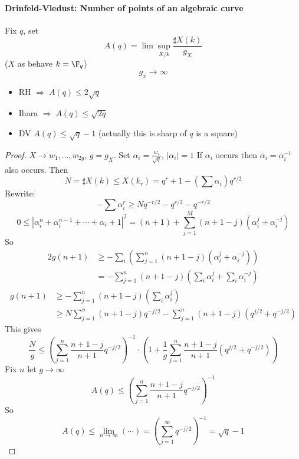 \paragraph{Drinfeld-Vledust: Number of points of an algebraic curve} Fix $q$, set
	$$A(q) = \lim\sup_{X/k} \frac{\sharp X(k)}{g_X}$$
	($X$ as behave $k=\F_q$)
	$$g_x\to \infty$$
	\begin{itemize}
	\item RH $\Rightarrow\; A(q)\leq 2\sqrt q$
	\item Ihara $\Rightarrow\; A(q)\leq \sqrt{2q}$
	\item DV $A(q)\leq \sqrt q-1$ (actually this is sharp of $q$ is a square)
	\end{itemize}
	
\begin{proof} $X\to w_1, \ldots, w_{2g}$, $g=g_{X}$. Set $\alpha_i=\frac{w_i}{\sqrt q}$, $|\alpha_i|=1$ If $\alpha_i$ occurs then $\overline\alpha_i=\alpha_i^{-1}$ also occurs. Then
	$$N=\sharp X(k)\leq X(k_r)=q^r+1-(\sum\alpha_i)q^{r/2}$$
Rewrite:
	$$-\sum\alpha_i^r\geq Nq^{-r/2}-q^{r/2}-q^{-r/2}$$
	$$0\leq |\alpha_i^n +\alpha_i^{n-1} +\cdots +\alpha_i +1|^2 =(n+1)+\sum_{j=1}^M(n+1-j)(\alpha_i^j+\alpha_i^{-j})$$
	So
	\begin{align*}
	2g(n+1) &\geq -\sum_i \left(\sum_{j=1}^n (n+1-j)(\alpha_i^j +\alpha_i^{-j})\right)\\
	&=-\sum_{j=1}^n (n+1-j)\left(\sum_i\alpha_i^j +\sum_i\alpha_i^{-j}\right)
	\end{align*}
	\begin{align*}
	g(n+1)&\geq -\sum_{j=1}^n (n+1-j)(\sum_i\alpha_i^j)\\
	&\geq N\sum_{j=1}^n (n+1-j)q^{-j/2}-\sum_{j=1}^n (n+1-j)(q^{j/2}+q^{-j/2})\end{align*}
	This gives
	$$\frac{N}{g}\leq \left(\sum_{j=1}^n \frac{n+1-j}{n+1}q^{-j/2} \right)^{-1}\cdot\left(1+\frac{1}{g}\sum_{j=1}^n\frac{n+1-j}{n+1}(q^{j/2}+q^{-j/2})\right)$$
	Fix $n$ let $g\to \infty$
	$$A(q)\leq \left(\sum_{j=1}^n \frac{n+1-j}{n+1}q^{-j/2}\right)^{-1}$$
	So 
	$$A(q)\leq \lim_{n\to\infty}(\cdots) = \left(\sum_{j=1}^\infty q^{-j/2}\right)^{-1}=\sqrt q-1$$
\end{proof}
